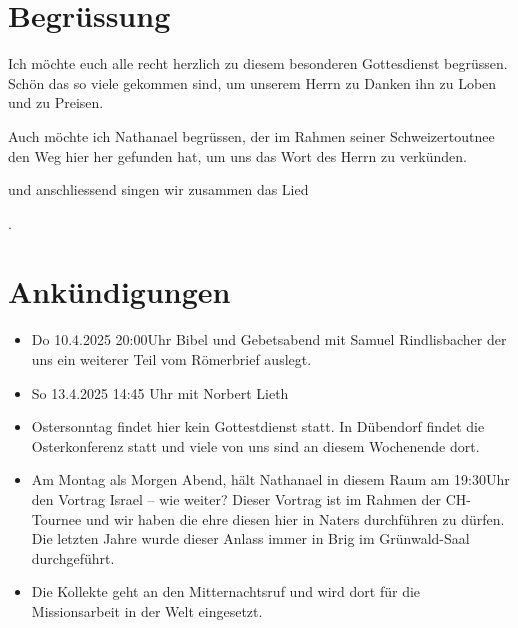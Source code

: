 
\section{Begrüssung}

Ich möchte euch alle recht herzlich zu diesem besonderen Gottesdienst begrüssen. Schön das so viele gekommen sind, um unserem Herrn zu Danken ihn zu Loben und zu Preisen.

Auch möchte ich Nathanael begrüssen, der im Rahmen seiner Schweizertoutnee den Weg hier her gefunden hat, um uns das Wort des Herrn zu verkünden. 

\noindent
\beten{} und anschliessend singen wir zusammen das Lied

\noindent
{}.

\section{Ankündigungen}
\begin{itemize}
    \item {} Do 10.4.2025 20:00Uhr Bibel und Gebetsabend mit Samuel Rindlisbacher der uns ein weiterer Teil vom Römerbrief auslegt.
    \item {} So 13.4.2025 14:45 Uhr mit Norbert Lieth
    \item {} Ostersonntag findet hier kein Gottestdienst statt. In Dübendorf findet die Osterkonferenz statt und viele von uns sind an diesem Wochenende dort.
    \item {} Am Montag als Morgen Abend, hält Nathanael in diesem Raum am 19:30Uhr den Vortrag Israel -- wie weiter? Dieser Vortrag ist im Rahmen der CH-Tournee und wir haben die ehre diesen hier in Naters durchführen zu dürfen. Die letzten Jahre wurde dieser Anlass immer in Brig im Grünwald-Saal durchgeführt.
    \item {} Die Kollekte geht an den Mitternachtsruf und wird dort für die Missionsarbeit in der Welt eingesetzt.
\end{itemize}

